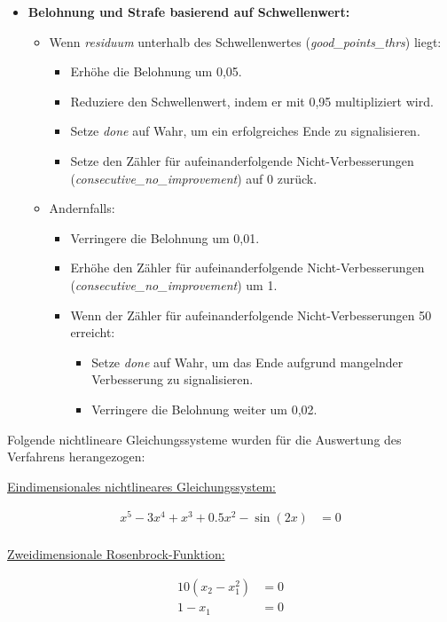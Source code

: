 \documentclass{article}
\theoremstyle{newline}
\begin{document}
\begin{onehalfspace}
\begin{itemize}
	\item \textbf{Belohnung und Strafe basierend auf Schwellenwert:}
	\begin{itemize}
		\item Wenn \textit{residuum} unterhalb des Schwellenwertes (\textit{good\_points\_thrs}) liegt:
		\begin{itemize}
			\item Erhöhe die Belohnung um 0,05.
			\item Reduziere den Schwellenwert, indem er mit 0,95 multipliziert wird.
			\item Setze \textit{done} auf Wahr, um ein erfolgreiches Ende zu signalisieren.
			\item Setze den Zähler für aufeinanderfolgende Nicht-Verbesserungen (\textit{consecutive\_no\_improvement}) auf 0 zurück.
		\end{itemize}
		\item Andernfalls:
		\begin{itemize}
			\item Verringere die Belohnung um 0,01.
			\item Erhöhe den Zähler für aufeinanderfolgende Nicht-Verbesserungen (\textit{consecutive\_no\_improvement}) um 1.
			\item Wenn der Zähler für aufeinanderfolgende Nicht-Verbesserungen 50 erreicht:
			\begin{itemize}
				\item Setze \textit{done} auf Wahr, um das Ende aufgrund mangelnder Verbesserung zu signalisieren.
				\item Verringere die Belohnung weiter um 0,02.
			\end{itemize}
		\end{itemize}
	\end{itemize}
\end{itemize}
Folgende nichtlineare Gleichungssysteme wurden für die Auswertung des Verfahrens herangezogen:
\smallskip

\underline{Eindimensionales nichtlineares Gleichungssystem:}

\begin{subequations}\label{nse:1}
	\begin{align}
		x^5 - 3x^4+x^3+0.5x^2 - \sin(2x)&= 0\\
	\end{align}
\end{subequations}

\underline{Zweidimensionale Rosenbrock-Funktion:}

\begin{subequations}\label{nse:rosenbrock}
	\begin{align}
		10(x_2 - x_1^2) &= 0\\
		1 - x_1 &=0
	\end{align}
\end{subequations}


\end{onehalfspace}
\end{document}
